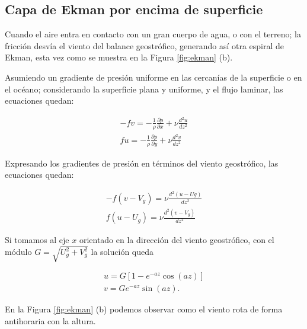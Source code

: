 \documentclass[openany]{book}
\begin{document}
\subsection{Capa de Ekman por encima de superficie}
Cuando el aire entra en contacto con un gran cuerpo de agua, o con el
terreno; la fricción desvía el viento del balance geostrófico,
generando así otra espiral de Ekman, esta vez como se muestra en la
Figura \ref{fig:ekman} (b).
\par Asumiendo un gradiente de presión uniforme en las cercanías de
la superficie o en el océano; considerando la superficie plana y
uniforme, y el flujo laminar, las ecuaciones quedan:

\begin{gather}
    -fv=-\frac{1}{\rho}\frac{\partial p}{\partial x}+\nu \frac{d^2u}{dz^2}\\
    fu=-\frac{1}{\rho}\frac{\partial p}{\partial y}+\nu \frac{d^2v}{dz^2}
\end{gather}

\par Expresando los gradientes de presión en términos del viento
geostrófico, las ecuaciones quedan:

\begin{gather}
    -f(v-V_{g})=\nu\frac{d^2(u-U{g})}{dz^2}\\
    f(u-U_{g})=\nu\frac{d^2(v-V_{g})}{dz^2}
\end{gather}

\par Si tomamos al eje $x$ orientado en la dirección del viento
geostrófico, con el módulo $G=\sqrt{U_{g}^2+V_{g}^2}$ la solución 
queda

\begin{gather}
    u=G[1-e^{-az}\cos{(az)}]\\
    v=Ge^{-az}\sin{(az)}.
\end{gather}

\par En la Figura \ref{fig:ekman} (b) podemos observar como el viento
rota de forma antihoraria con la altura.

\end{document}
